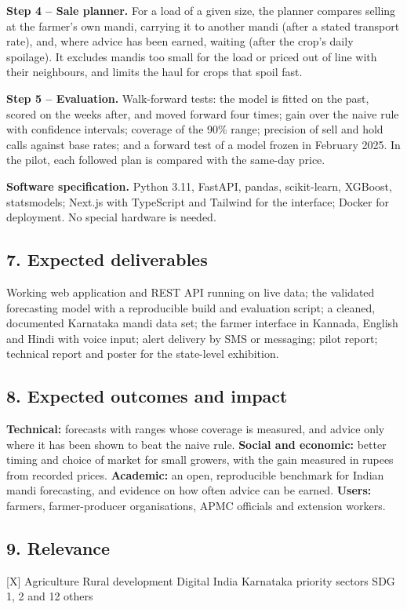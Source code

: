 \documentclass[11pt,a4paper]{article}
\begin{document}
\textbf{Step 4 -- Sale planner.} For a load of a given size, the planner compares selling at the farmer's own mandi, carrying it to another mandi (after a stated transport rate), and, where advice has been earned, waiting (after the crop's daily spoilage). It excludes mandis too small for the load or priced out of line with their neighbours, and limits the haul for crops that spoil fast.

\textbf{Step 5 -- Evaluation.} Walk-forward tests: the model is fitted on the past, scored on the weeks after, and moved forward four times; gain over the naive rule with confidence intervals; coverage of the 90\% range; precision of sell and hold calls against base rates; and a forward test of a model frozen in February 2025. In the pilot, each followed plan is compared with the same-day price.

\textbf{Software specification.} Python 3.11, FastAPI, pandas, scikit-learn, XGBoost, statsmodels; Next.js with TypeScript and Tailwind for the interface; Docker for deployment. No special hardware is needed.

\subsection*{7. Expected deliverables}
Working web application and REST API running on live data; the validated forecasting model with a reproducible build and evaluation script; a cleaned, documented Karnataka mandi data set; the farmer interface in Kannada, English and Hindi with voice input; alert delivery by SMS or messaging; pilot report; technical report and poster for the state-level exhibition.

\subsection*{8. Expected outcomes and impact}
\textbf{Technical:} forecasts with ranges whose coverage is measured, and advice only where it has been shown to beat the naive rule. \textbf{Social and economic:} better timing and choice of market for small growers, with the gain measured in rupees from recorded prices. \textbf{Academic:} an open, reproducible benchmark for Indian mandi forecasting, and evidence on how often advice can be earned. \textbf{Users:} farmers, farmer-producer organisations, APMC officials and extension workers.

\subsection*{9. Relevance}
[X] Agriculture \quad [X] Rural development \quad [X] Digital India \quad [X] Karnataka priority sectors \quad [X] SDG 1, 2 and 12 \quad [\ ] others
\end{document}
